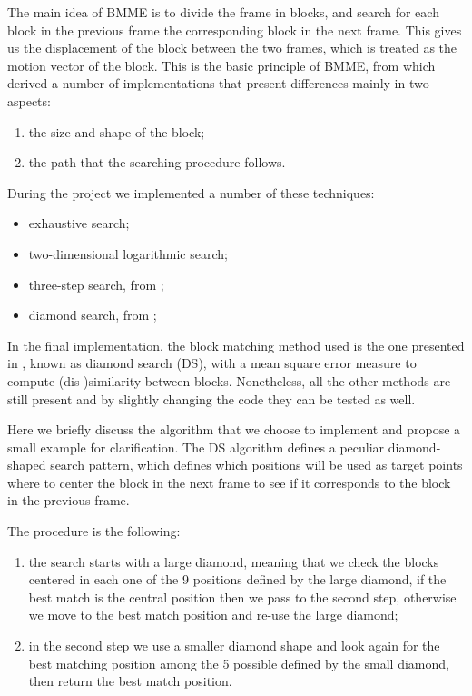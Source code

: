 The main idea of BMME is to divide the frame in blocks, and search for each block in the previous frame the corresponding block in the next frame.
This gives us the displacement of the block between the two frames, which is treated as the motion vector of the block.
This is the basic principle of BMME, from which derived a number of implementations that present differences mainly in two aspects:
\begin{enumerate}
    \item the size and shape of the block;
    \item the path that the searching procedure follows.
\end{enumerate}

During the project we implemented a number of these techniques:
\begin{itemize}
    \item exhaustive search;
    \item two-dimensional logarithmic search;
    \item three-step search, from \cite{Li94};
    \item diamond search, from \cite{Zhu2000};
\end{itemize}

In the final implementation, the block matching method used is the one presented in \cite{Zhu2000}, known as diamond search (DS),  with a mean square error measure to compute (dis-)similarity between blocks.
Nonetheless, all the other methods are still present and by slightly changing the code they can be tested as well.

Here we briefly discuss the algorithm that we choose to implement and propose a small example for clarification.
The DS algorithm defines a peculiar diamond-shaped search pattern, which defines which positions will be used as target points where to center the block in the next frame to see if it corresponds to the block in the previous frame.

The procedure is the following:
\begin{enumerate}
    \item the search starts with a large diamond, meaning that we check the blocks centered in each one of the 9 positions defined by the large diamond, if the best match is the central position then we pass to the second step, otherwise we move to the best match position and re-use the large diamond;
    \item in the second step we use a smaller diamond shape and look again for the best matching position among the 5 possible defined by the small diamond, then return the best match position.
\end{enumerate}


